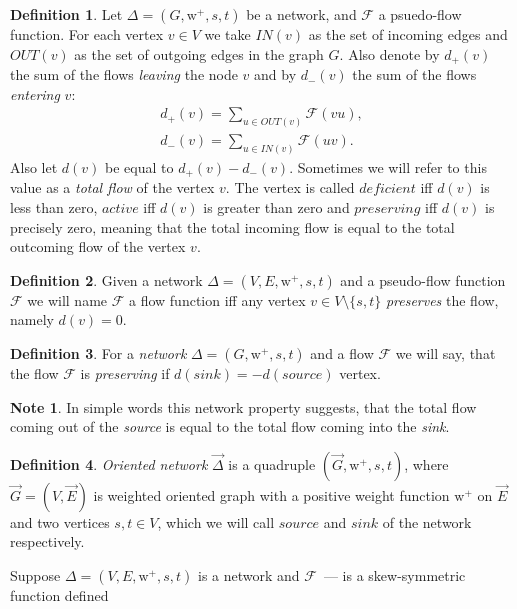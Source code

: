 \documentclass[12pt]{article}
\theoremstyle{definition}
\newtheorem*{note}{Note}
\newtheorem{definition}{Definition}
\newcommand{\wtpos}{\mathrm{w}^+}
\newcommand{\flow}{\mathcal{F}}
\newcommand{\source}{\mathit{source}}
\newcommand{\sink}{\mathit{sink}}
\newcommand{\net}{\Delta}
\newcommand{\onet}{\vec{\Delta}}
\numberwithin{remark}{section}
\numberwithin{theorem}{section}
\numberwithin{prop}{section}
\numberwithin{equation}{section}
\numberwithin{lemma}{section}
\numberwithin{prop_under_lemma}{lemma}
\begin{document}
    \begin{definition}
      Let $\net = (G, \wtpos, s, t)$ be a network, and $\flow$ a psuedo-flow function.
      For each vertex $v \in V$ we take $IN(v)$ as the set of incoming edges
      and $OUT(v)$ as the set of outgoing edges in the graph $G$.
      Also denote by $d_{+}(v)$ the sum of the flows \textit{leaving} the node $v$ and by
      $d_{-}(v)$ the sum of the flows \textit{entering} $v$:
      \begin{align*}
          d_{+}(v) = \sum_{u \in OUT(v)} \flow(vu),\\
          d_{-}(v) = \sum_{u \in IN(v)} \flow(uv).
      \end{align*}
      Also let $d(v)$ be equal to $d_{+}(v) - d_{-}(v)$. Sometimes we will refer to this value as
      a \textit{total flow} of the vertex $v$.
      The vertex is called $deficient$ iff $d(v)$ is less than zero,
      $active$ iff $d(v)$ is greater than zero and
      $preserving$ iff $d(v)$ is precisely zero, meaning that the total incoming flow
      is equal to the total outcoming flow of the vertex $v$.
    \end{definition}
    \begin{definition}
      Given a network $\net = (V, E, \wtpos, s, t)$ and a pseudo-flow function $\flow$ we will name $\flow$ a flow function iff 
      any vertex $v \in V \setminus \{s,t\}$ \textit{preserves} the flow, namely $d(v) = 0$.
    \end{definition}
    \begin{definition}
      For a \textit{network} $\net = (G, \wtpos, s, t)$ and a flow $\flow$ we will say,
      that the flow $\flow$ is \textit{preserving} if $d(\mathit{sink}) = -d(\mathit{source})$ vertex.
    \end{definition}
    \begin{note}
      In simple words this network property suggests, 
      that the total flow coming out of the \textit{source} is equal to the total flow
      coming into the \textit{sink}.
    \end{note}
    \begin{definition}
        \textit{Oriented network} $\onet$ is a quadruple $(\vec{G}, \wtpos, s, t)$, where
        $\vec{G} = (V, \vec{E})$ is weighted oriented graph 
        with a positive weight function $\wtpos$ on $\vec{E}$ and two vertices $s, t \in V$, which
        we will call $\source$ and $\sink$ of the network respectively.
    \end{definition}
    Suppose $\net = (V, E, \wtpos, s, t)$ is a network and $\flow$~--- is a skew-symmetric function defined
\end{document}
